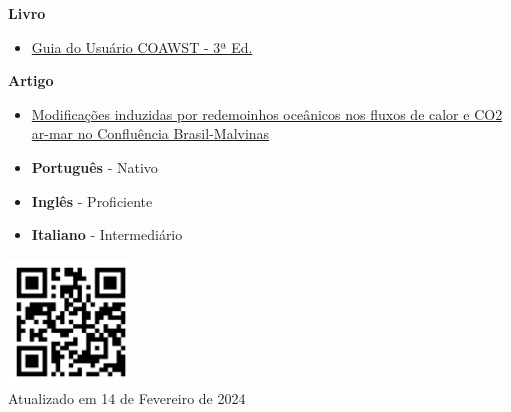 \documentclass[9pt]{developercv} %
\begin{document}
\vspace{-0.4cm}

\begin{minipage}[t]{0.3\textwidth}
	\vspace{-\baselineskip} %
	
	
	\textbf{Livro} %
	\textcolor{gray}{}
	 \begin{itemize}
		\item \small\textcolor{bleu_cite}{\href{http://mtc-m21c.sid.inpe.br/col/sid.inpe.br/mtc-m21c/2020/10.02.15.11/doc/publicacao.pdf}{Guia do Usuário COAWST - 3ª Ed.}}
	 \end{itemize}
	 \textbf{Artigo}
	 \begin{itemize}
		\item \small\textcolor{bleu_cite}{\href{https://www.nature.com/articles/s41598-021-89985-9}{Modificações induzidas por redemoinhos oceânicos nos fluxos de calor e CO2 ar-mar no Confluência Brasil-Malvinas}}
	 \end{itemize}  
\end{minipage}
\hfill
\begin{minipage}[t]{0.3\textwidth}
	\vspace{-\baselineskip} %

	\vspace{-0.3cm}
	\begin{itemize}
	\itemsep0em
	\item \textbf{Português} - Nativo
	\item \textbf{Inglês} - Proficiente
	\item \textbf{Italiano} - Intermediário 
	\end{itemize}
	\vspace{0.2cm}
	
    \centering\includegraphics[width=0.25\textwidth]{qrcode.png}\\
	\centering\tiny Atualizado em 14 de Fevereiro de 2024
\end{minipage}
\end{document}
